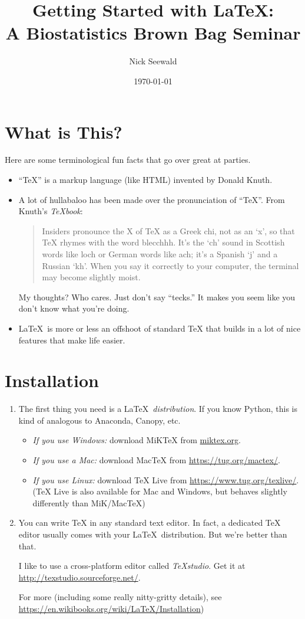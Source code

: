 \documentclass[12pt]{article}
\title{Getting Started with \LaTeX: \\
	\large{A Biostatistics Brown Bag Seminar}}
\author{Nick Seewald}
\date{\today}
\begin{document}
	\maketitle
	
	\section{What is This?}
	
	Here are some terminological fun facts that go over great at parties.
	\begin{itemize}
		\item ``TeX'' is a markup language (like HTML) invented by Donald Knuth.
		\item A lot of hullabaloo has been made over the pronunciation of ``TeX''. From Knuth's \textit{TeXbook}:
		\begin{quote}
			Insiders pronounce the X of TeX as a Greek chi, not as an ‘x’, so that TeX rhymes with the word blecchhh. It’s the ‘ch’ sound in Scottish words like loch or German words like ach; it’s a Spanish ‘j’ and a Russian ‘kh’. When you say it correctly to your computer, the terminal may become slightly moist.
		\end{quote}
		My thoughts? Who cares. Just don't say ``tecks.'' It makes you seem like you don't know what you're doing.
		\item \LaTeX \ is more or less an offshoot of standard TeX that builds in a lot of nice features that make life easier.
	\end{itemize}
	
	\section{Installation}
	
	\begin{enumerate}
		\item The first thing you need is a \LaTeX \ \textit{distribution}. If you know Python, this is kind of analogous to Anaconda, Canopy, etc.
		\begin{itemize}
			\item \textit{If you use Windows:} download MiKTeX from \url{miktex.org}.
			\item \textit{If you use a Mac:} download MacTeX from \url{https://tug.org/mactex/}.
			\item \textit{If you use Linux:} download TeX Live from \url{https://www.tug.org/texlive/}. (TeX Live is also available for Mac and Windows, but behaves slightly differently than MiK/MacTeX)
		\end{itemize}
		\item You can write TeX in any standard text editor. In fact, a dedicated TeX editor usually comes with your \LaTeX \ distribution. But we're better than that.
		
		I like to use a cross-platform editor called \textit{TeXstudio}. Get it at \url{http://texstudio.sourceforge.net/}.
		
		For more (including some really nitty-gritty details), see \url{https://en.wikibooks.org/wiki/LaTeX/Installation}) \cite{wikibooks}
	\end{enumerate}
	
\end{document}
